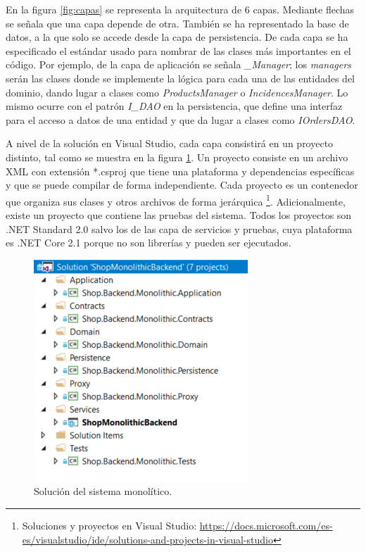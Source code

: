 \documentclass[11pt,spanish,listoffigures]{tfgetsinf}
\begin{document}
En la figura \ref{fig:capas} se representa la arquitectura de 6 capas. Mediante flechas se señala que una capa depende de otra. También se ha representado la base de datos, a la que solo se accede desde la capa de persistencia. De cada capa se ha especificado el estándar usado para nombrar de las clases más importantes en el código. Por ejemplo, de la capa de aplicación se señala \textit{\_Manager}; los \textit{managers} serán las clases donde se implemente la lógica para cada una de las entidades del dominio, dando lugar a clases como \textit{ProductsManager} o \textit{IncidencesManager}. Lo mismo ocurre con el patrón \textit{I\_DAO} en la persistencia, que define una interfaz para el acceso a datos de una entidad y que da lugar a clases como \textit{IOrdersDAO}.

A nivel de la solución en Visual Studio, cada capa consistirá en un proyecto distinto, tal como se muestra en la figura \ref{fig:MonolithicSolution}. Un proyecto consiste en un archivo XML con extensión *.csproj que tiene una plataforma y dependencias específicas y que se puede compilar de forma independiente. Cada proyecto es un contenedor que organiza sus clases y otros archivos de forma jerárquica \footnote{ Soluciones y proyectos en Visual Studio: \url{https://docs.microsoft.com/es-es/visualstudio/ide/solutions-and-projects-in-visual-studio}}. Adicionalmente, existe un proyecto que contiene las pruebas del sistema. Todos los proyectos son .NET Standard 2.0 salvo los de las capa de servicios y pruebas, cuya plataforma es .NET Core 2.1 porque no son librerías y pueden ser ejecutados.

\begin{figure}[h]
\centering
\includegraphics[scale=0.8]{MonolithicSolution}
\caption{Solución del sistema monolítico.}
\label{fig:MonolithicSolution}
\end{figure}
\end{document}
